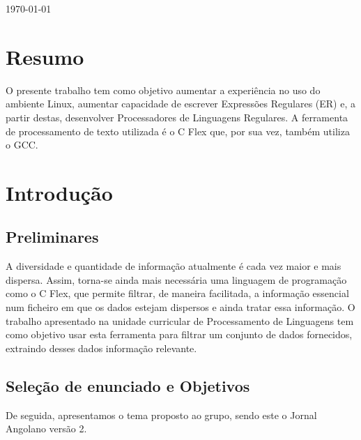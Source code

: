 \documentclass[25pt]{article}
\begin{document}
\begin{titlepage}
    
    {\large \today}\\[2cm]
    
    
    
    
    \vfill %
    
    \end{titlepage}
    \section{Resumo}
    O presente trabalho tem como objetivo aumentar a experiência no uso do ambiente Linux, aumentar capacidade de escrever 
    Expressões Regulares (ER) e, a partir destas, desenvolver Processadores de Linguagens Regulares.
    A ferramenta de processamento de texto utilizada é o C Flex que, por sua vez, também utiliza o GCC.
    
    \newpage
    \tableofcontents
    \newpage
    \section{Introdução}
    \subsection{Preliminares}
    A diversidade e quantidade de informação atualmente é cada vez maior e mais dispersa.
    Assim, torna-se ainda mais necessária uma linguagem de programação como o 
    C Flex, que permite filtrar, de maneira facilitada, a informação essencial num ficheiro em que os dados estejam dispersos 
    e ainda tratar essa informação. O trabalho apresentado na unidade curricular de Processamento de Linguagens tem como 
    objetivo usar esta ferramenta para filtrar um conjunto de dados fornecidos, extraindo desses dados informação relevante.
    \subsection{Sele\c{c}\~ao de enunciado e Objetivos}
    De seguida, apresentamos o tema proposto ao grupo, sendo este o Jornal Angolano versão 2. \\
\end{document}
